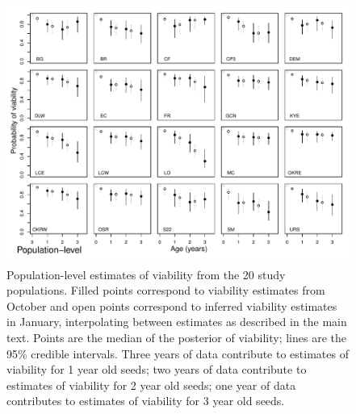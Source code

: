 \documentclass[12pt, oneside]{article}   	%
\begin{document}
 \begin{figure}[!h]
   \centering
       \includegraphics[page=1,width=1\textwidth]{../../figures/viability-estimates-population.pdf}  
    \caption{ Population-level estimates of viability from the 20 study populations. Filled points correspond to viability estimates from October and open points correspond to inferred viability estimates in January, interpolating between estimates as described in the main text. Points are the median of the posterior of viability; lines are the 95\% credible intervals. Three years of data contribute to estimates of viability for 1 year old seeds; two years of data contribute to estimates of viability for 2 year old seeds; one year of data contributes to estimates of viability for 3 year old seeds. }
 \label{fig:viability-estimates-population}
\end{figure}
\end{document}
